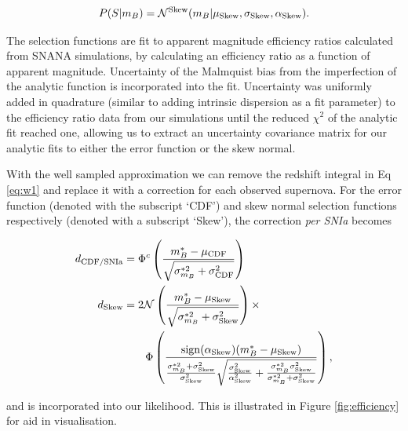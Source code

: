 \documentclass[a4paper,fleqn,usenatbib]{mnras}
\begin{document}
\begin{align}
P(S|m_B) = \mathcal{N}^{{\rm Skew}}(m_B | \mu_{\rm Skew}, \sigma_{\rm Skew}, \alpha_{\rm Skew}).
\end{align}


The selection functions are fit to apparent magnitude efficiency ratios calculated from SNANA simulations, by calculating an efficiency ratio as a function of apparent magnitude. Uncertainty of the Malmquist bias from the imperfection of the analytic function is incorporated into the fit. Uncertainty was uniformly added in quadrature (similar to adding intrinsic dispersion as a fit parameter) to the efficiency ratio data from our simulations until the reduced $\chi^2$ of the analytic fit reached one, allowing us to extract an uncertainty covariance matrix for our analytic fits to either the error function or the skew normal.


With the well sampled approximation we can remove the redshift integral in Eq \eqref{eq:w1} and replace it with a correction for each observed supernova. For the error function (denoted with the subscript `CDF') and skew normal selection functions respectively (denoted with a subscript `Skew'), the correction \textit{per SNIa} becomes

\begin{align}
d_{\rm CDF/SNIa} &= \Phi^c\left(  \frac{m^*_B - \mu_{\rm CDF}}{\sqrt{\sigma^{*2}_{m_B} + \sigma_{\rm CDF}^2}}  \right) \label{eq:seldes}\\
d_{\rm Skew} &= 2\mathcal{N}\left( \frac{m_B^* - \mu_{\rm Skew}}{\sqrt{\sigma^{*2}_{m_B} + \sigma_{\rm Skew}^2}}\right) \times \notag\\
&\quad\quad \Phi\left(  \frac{{\rm sign}(\alpha_{\rm Skew})(m_B^* - \mu_{\rm Skew})}{\frac{\sigma_{m_B}^{*2} + \sigma^2_{\rm Skew}}{\sigma^2_{\rm Skew}} \sqrt{\frac{\sigma^2_{\rm Skew}}{\alpha^2_{\rm Skew}} + \frac{\sigma_{m_B}^{*2} \sigma^2_{\rm Skew}}{\sigma_{m_B}^{*2} + \sigma^2_{\rm Skew}}} }\right), \label{eq:sellowz}
\end{align}

and is incorporated into our likelihood. This is illustrated in Figure \ref{fig:efficiency} for aid in visualisation.
\end{document}
